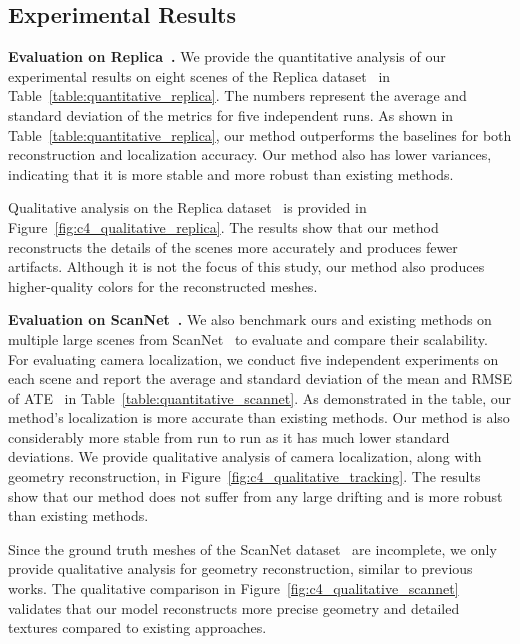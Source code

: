 \subsection{Experimental Results}
\noindent\textbf{Evaluation on Replica~\citep{replica19arxiv}.} We provide the quantitative analysis of our experimental results on eight scenes of the Replica dataset~\citep{replica19arxiv} in Table~\ref{table:quantitative_replica}. The numbers represent the average and standard deviation of the metrics for five independent runs. As shown in Table~\ref{table:quantitative_replica}, our method outperforms the baselines for both reconstruction and localization accuracy. Our method also has lower variances, indicating that it is more stable and more robust than existing methods.

Qualitative analysis on the Replica dataset~\citep{replica19arxiv} is provided in Figure~\ref{fig:c4_qualitative_replica}. The results show that our method reconstructs the details of the scenes more accurately and produces fewer artifacts. Although it is not the focus of this study, our method also produces higher-quality colors for the reconstructed meshes.

\vspace{1ex}
\noindent\textbf{Evaluation on ScanNet~\citep{dai2017scannet}.} We also benchmark ours and existing methods on multiple large scenes from ScanNet~\citep{dai2017scannet} to evaluate and compare their scalability. For evaluating camera localization, we conduct five independent experiments on each scene and report the average and standard deviation of the mean and RMSE of ATE~\citep{sturm2012benchmark} in Table~\ref{table:quantitative_scannet}. As demonstrated in the table, our method's localization is more accurate than existing methods. Our method is also considerably more stable from run to run as it has much lower standard deviations. We provide qualitative analysis of camera localization, along with geometry reconstruction, in Figure~\ref{fig:c4_qualitative_tracking}. The results show that our method does not suffer from any large drifting and is more robust than existing methods.

Since the ground truth meshes of the ScanNet dataset~\citep{dai2017scannet} are incomplete, we only provide qualitative analysis for geometry reconstruction, similar to previous works. The qualitative comparison in Figure~\ref{fig:c4_qualitative_scannet} validates that our model reconstructs more precise geometry and detailed textures compared to existing approaches.

